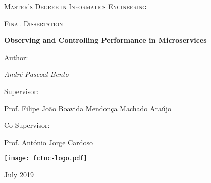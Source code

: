 \begin{titlepage}
	\centering
	{\scshape\LARGE Master’s Degree in Informatics Engineering \par}
	
	\vspace{0.2cm}
	{\scshape Final Dissertation\par}
	
	\vspace{1.5cm}
	{\huge\bfseries Observing and Controlling Performance in Microservices\par}
	
	\vspace{2cm}
	{Author:\par \Large\itshape André Pascoal Bento\par}
	
	\vfill
	Supervisor:\par
	\large Prof. Filipe João Boavida Mendonça Machado Araújo\par
	
	\vspace{0.5cm}
	Co-Supervisor:\par
	\large Prof. António Jorge Cardoso\par
    
    \texttt{[image: fctuc-logo.pdf]}\par
    
    \vspace{0.5cm}
	\vfill

	{\Large July 2019\par}
\end{titlepage}
